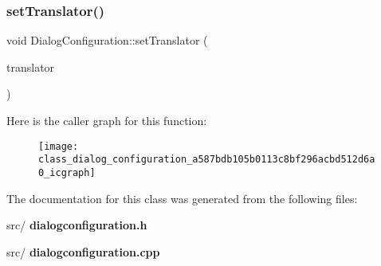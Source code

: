 \mbox{\label{class_dialog_configuration_a587bdb105b0113c8bf296acbd512d6a0}} 
\subsubsection{set\+Translator()}
{\footnotesize\ttfamily void Dialog\+Configuration\+::set\+Translator (\begin{DoxyParamCaption}\item[{Q\+Translator $\ast$}]{translator }\end{DoxyParamCaption})}

Here is the caller graph for this function\+:\nopagebreak
\begin{figure}[H]
\begin{center}
\leavevmode
\texttt{[image: class\_dialog\_configuration\_a587bdb105b0113c8bf296acbd512d6a0\_icgraph]}
\end{center}
\end{figure}


The documentation for this class was generated from the following files\+:\begin{DoxyCompactItemize}
\item 
src/\textbf{ dialogconfiguration.\+h}\item 
src/\textbf{ dialogconfiguration.\+cpp}\end{DoxyCompactItemize}
